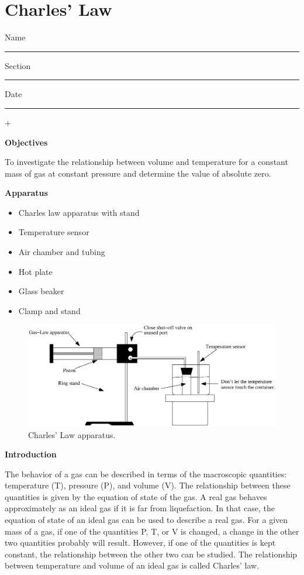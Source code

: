 
\section{Charles' Law}

Name \rule{2.0in}{0.1pt}\hfill{}Section \rule{1.0in}{0.1pt}\hfill{}Date
\rule{1.0in}{0.1pt}+

\textbf{Objectives} 

To investigate the relationship between volume and temperature for
a constant mass of gas at constant pressure and determine the value
of absolute zero.

\textbf{Apparatus} 

\begin{itemize}
\item Charles law apparatus with stand
\item Temperature sensor
\item Air chamber and tubing
\item Hot plate
\item Glass beaker
\item Clamp and stand
\end{itemize}
\vspace{0.3cm}

\begin{figure}[hbt]
\begin{center}
\includegraphics[width=6.0in]{charles_law/charles_law_fig1.eps}
\caption{Charles' Law apparatus.}
\end{center}
\end{figure}

\textbf{Introduction}

The behavior of a gas can be described in terms of the macroscopic quantities:
temperature (T), pressure (P), and volume (V). The relationship between these
quantities is given by the equation of state of the gas. A real gas behaves
approximately as an ideal gas if it is far from liquefaction. In that case,
the equation of state of an ideal gas can be used to describe a real gas. For
a given mass of a gas, if one of the quantities P, T, or V is changed, a change
in the other two quantities probably will result. However, if one of the quantities
is kept constant, the relationship between the other two can be studied. The
relationship between temperature and volume of an ideal gas is called Charles' law.


